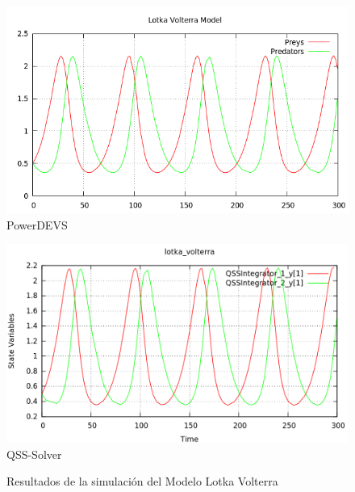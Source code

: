 \documentclass{beamer}
\begin{document}
\begin{frame}
\begin{figure}[H]
\centering
\begin{minipage}{0.5\textwidth}
\centering
 \includegraphics[width=\linewidth]{lotka_voltera-pd}
PowerDEVS \\
\end{minipage}\hfill
\begin{minipage}{0.5\textwidth}
\centering
 \includegraphics[width=\linewidth]{lotka_voltera-qss}
QSS-Solver \\
\end{minipage}
\label{graph:lotka_voltera}
\caption{Resultados de la simulación del Modelo Lotka Volterra}
\end{figure}
\end{frame}
\end{document}

